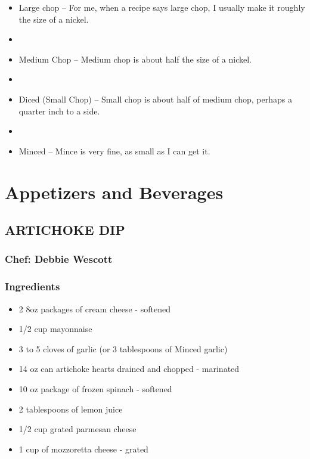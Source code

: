 \documentclass[
]{book}
\providecommand{\tightlist}{%
  \setlength{\itemsep}{0pt}\setlength{\parskip}{0pt}}
\begin{document}
\begin{itemize}
\item
  Large chop -- For me, when a recipe says large chop, I usually make it roughly the size of a nickel.
\item
\item
  Medium Chop -- Medium chop is about half the size of a nickel.
\item
\item
  Diced (Small Chop) -- Small chop is about half of medium chop, perhaps a quarter inch to a side.
\item
\item
  Minced -- Mince is very fine, as small as I can get it.
\end{itemize}

\hypertarget{appetizers}{%
\chapter{Appetizers and Beverages}\label{appetizers}}

\hypertarget{artichoke-dip}{%
\section*{ARTICHOKE DIP}\label{artichoke-dip}}


\hypertarget{chef-debbie-wescott}{%
\subsection*{Chef: Debbie Wescott}\label{chef-debbie-wescott}}


\hypertarget{ingredients}{%
\subsection*{Ingredients}\label{ingredients}}


\begin{itemize}
\tightlist
\item
  2 8oz packages of cream cheese - softened
\item
  1/2 cup mayonnaise
\item
  3 to 5 cloves of garlic (or 3 tablespoons of Minced garlic)
\item
  14 oz can artichoke hearts drained and chopped - marinated
\item
  10 oz package of frozen spinach - softened
\item
  2 tablespoons of lemon juice
\item
  1/2 cup grated parmesan cheese
\item
  1 cup of mozzoretta cheese - grated
\end{itemize}
\end{document}
